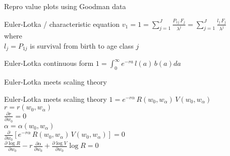 \documentclass{beamer}
\begin{document}
\begin{frame}{Repro value plots using Goodman data}
\end{frame}

\begin{frame}{Euler-Lotka / characteristic equation}
  $v_1 = 1 = \displaystyle\sum\limits_{j=1}^{J} \frac{P_{1j} \, F_j}{\lambda^j} = \displaystyle\sum\limits_{j=1}^{J} \frac{l_j \, F_j}{\lambda^j}$\\
\vspace{.5cm}
where\\
\vspace{.5cm}
  $l_j = P_{1j}$ is survival from birth to age class $j$\\
\end{frame}

\begin{frame}{Euler-Lotka continuous form}
  $1 = \int_{0}^{\infty} e^{-ra} \, l(a) \, b(a) da$\\
\end{frame}

\begin{frame}{Euler-Lotka meets scaling theory}
\end{frame}

{
  
}

\begin{frame}{Euler-Lotka meets scaling theory}
  $1 = e^{-r \alpha} \, R(w_0,w_{\alpha}) \, V(w_0,w_{\alpha})$\\
  \vspace{.5cm}
  \pause
  $r = r(w_0,w_{\alpha})$\\
  \vspace{.5cm}
  \pause
  $\frac{\partial r}{\partial w_0} = 0$\\
  \vspace{.5cm}
  \pause
  $\alpha = \alpha(w_0,w_{\alpha})$\\
  \vspace{.5cm}
  \pause
  $\frac{\partial}{\partial w_0} \left[ e^{-r \alpha} \, R(w_0,w_{\alpha}) \, V(w_0,w_{\alpha}) \right] = 0$\\
  \vspace{.5cm}
  \pause
  $\frac{\partial \log{R}}{\partial w_0} - r \, \frac{\partial \alpha}{\partial w_0} + \frac{\partial \log{V}}{\partial w_0} \log{R} = 0$\\
\end{frame}
\end{document}
